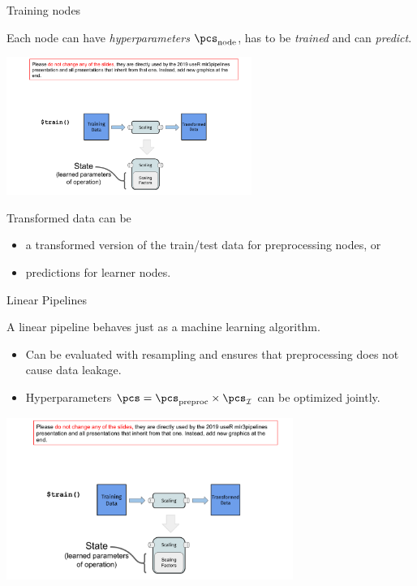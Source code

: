 \begin{frame}{Training nodes}

	Each node can have \textit{hyperparameters} $\pcs_{\text{node}}$, has to be \textit{trained} and can \textit{predict}.

	\begin{center}
		\includegraphics[page=2, width=0.6\textwidth, trim=111 0 130 160, clip]{images/mlr3Pipelines_graphics}
	\end{center}

	Transformed data can be 
	\begin{itemize}
		\item a transformed version of the train/test data for preprocessing nodes, or
		\item predictions for learner nodes.
	\end{itemize}

\end{frame}

\begin{frame}{Linear Pipelines}

A linear pipeline behaves just as a machine learning algorithm.

	\begin{itemize}
		\item Can be evaluated with resampling and ensures that preprocessing does not cause data leakage.
		\item Hyperparameters $\pcs = \pcs_{\text{preproc}} \times \pcs_\inducer$ can be optimized jointly.
	\end{itemize}

	\begin{center}
	\includegraphics[page=19, width=0.7\textwidth, trim=20 60 30 35, clip]{images/mlr3Pipelines_graphics}
	\end{center}
\end{frame}

